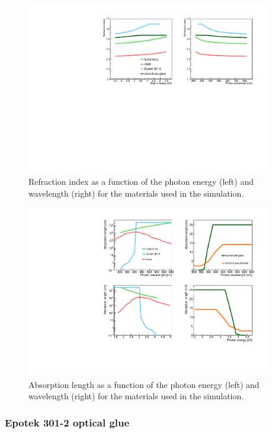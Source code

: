 \begin{figure}[!h]
\centering
\includegraphics[angle=0,width=0.95\textwidth]{pics/refind1.pdf}
\caption{\label{pic:mat1}
Refraction index as a function of the photon energy (left) and wavelength (right) for the materials used in the simulation.
}
\end{figure}

\begin{figure}[!h]
\centering
\includegraphics[angle=0,width=0.95\textwidth]{pics/ablen1.pdf}
\caption{\label{pic:mat2}
Absorption length as a function of the photon energy (left) and wavelength (right) for the materials used in the simulation.
}
\end{figure}

\subsubsection*{Epotek 301-2 optical glue}

